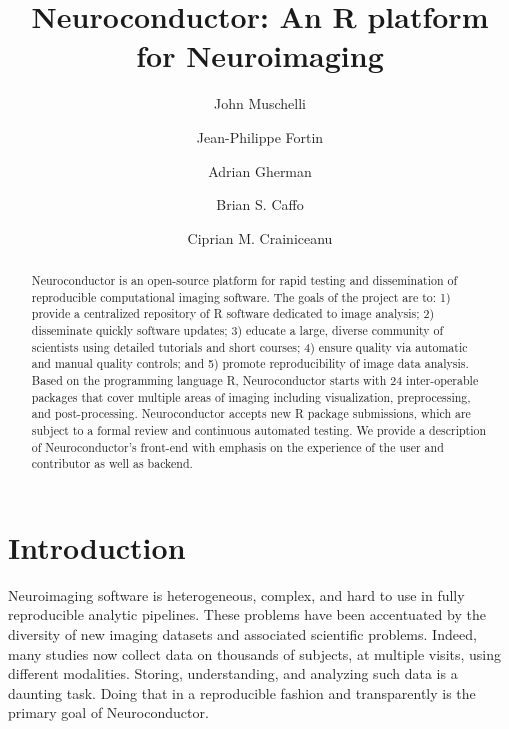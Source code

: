 \documentclass[]{elsarticle} %
\newcommand{\fixme}[1]{{\color{red} #1}}
\begin{document}
\begin{frontmatter}

  \title{Neuroconductor: An R platform for Neuroimaging}
    \author[JHU]{John Muschelli}
    \author[Penn]{Jean-Philippe Fortin}
  
    \author[JHU]{Adrian Gherman}
  
    \author[JHU]{Brian S. Caffo}
  
    \author[JHU]{Ciprian M. Crainiceanu}
  
      \address[JHU]{Johns Hopkins Bloomberg School of Public Health, Department of
Biostatistics, 615 N Wolfe St, Baltimore, MD, 21205}
    \address[Penn]{Perelman School of Medicine, University of Pennsylvania, Department of
Biostatistics and Epidemiology, 423 Guardian Drive, Philadelphia, PA
19104}
  
  \begin{abstract}
Neuroconductor is an open-source platform for rapid testing and dissemination of reproducible computational imaging software. The goals of the project are to: 1) provide a centralized repository of R software dedicated to image analysis; 2) disseminate quickly software updates; 3) educate a large, diverse community of scientists using detailed tutorials and short courses; 4) ensure quality via automatic and manual quality controls; and 5) promote reproducibility of image data analysis. Based on the  programming language R, Neuroconductor starts with \fixme{24} inter-operable packages that cover multiple areas of imaging including visualization, preprocessing, and post-processing. Neuroconductor accepts new R package submissions, which are subject to a formal review and continuous automated testing. We provide a description of Neuroconductor's front-end with emphasis on the experience of the user and contributor as well as backend.   
  \end{abstract}
 
 \end{frontmatter}

\section{Introduction}\label{introduction}

Neuroimaging software is heterogeneous, complex, and hard to use in fully reproducible analytic pipelines. These problems have been accentuated by the diversity of new imaging datasets and associated scientific problems. Indeed, many studies now collect data on thousands of subjects, at multiple visits, using different modalities. Storing, understanding, and analyzing such data is a daunting task. Doing that in a reproducible fashion and transparently is the primary goal of Neuroconductor.
 
\end{document}
